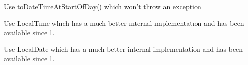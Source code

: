 \begin{DoxyRefList}
\item[\label{deprecated__deprecated000013}%
\hypertarget{deprecated__deprecated000013}{}%
Member \hyperlink{classorg_1_1joda_1_1time_1_1_local_date_adfba25c6eecf7a2ab6b38bb31aa7b4a3}{org.joda.time.Local\-Date.to\-Date\-Time\-At\-Midnight} ()]Use \hyperlink{}{to\-Date\-Time\-At\-Start\-Of\-Day()} which won't throw an exception  
\item[\label{deprecated__deprecated000017}%
\hypertarget{deprecated__deprecated000017}{}%
Class \hyperlink{classorg_1_1joda_1_1time_1_1_time_of_day}{org.joda.time.Time\-Of\-Day} ]Use Local\-Time which has a much better internal implementation and has been available since 1.  
\item[\label{deprecated__deprecated000019}%
\hypertarget{deprecated__deprecated000019}{}%
Class \hyperlink{classorg_1_1joda_1_1time_1_1_year_month_day}{org.joda.time.Year\-Month\-Day} ]Use Local\-Date which has a much better internal implementation and has been available since 1. 
\end{DoxyRefList}
